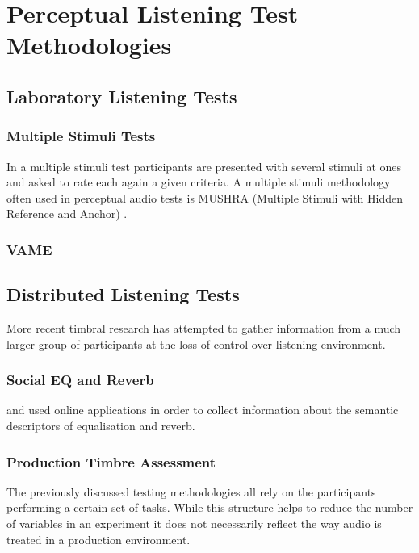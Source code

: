 \chapter{Perceptual Listening Test Methodologies}
\label{chap:SAFE}

\section{Laboratory Listening Tests}
\label{sec:Laboratory-Listening-Tests}

\subsection{Multiple Stimuli Tests}
\label{sec:Multiple-Stimuli-Tests}
	In a multiple stimuli test participants are presented with several stimuli at ones and asked to rate each again a
	given criteria. A multiple stimuli methodology often used in perceptual audio tests is MUSHRA (Multiple Stimuli with
	Hidden Reference and Anchor) \citep{mushra2014}.

\subsection{VAME}
\label{sec:VAME}
\citet{kendall1993verbal1, kendall1993verbal2}

\section{Distributed Listening Tests}
\label{sec:Distributed-Listening-Tests}
	More recent timbral research has attempted to gather information from a much larger group of participants at the
	loss of control over listening environment.

\subsection{Social EQ and Reverb}
\label{sec:Social-EQ-and-Reverb}
	\citet{cartwright2013socialeq} and \citet{seetharaman2014crowdsourcing} used online applications in order to collect
	information about the semantic descriptors of equalisation and reverb.

\subsection{Production Timbre Assessment} %
\label{sec:Production-Timbre-Assessment}
	The previously discussed testing methodologies all rely on the participants performing a certain set of tasks. While
	this structure helps to reduce the number of variables in an experiment it does not necessarily reflect the way
	audio is treated in a production environment.

